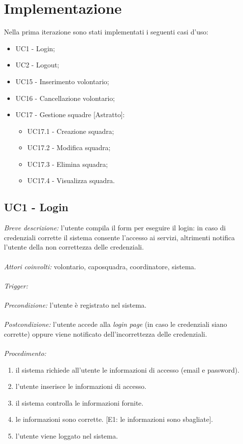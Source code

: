 \section{Implementazione}
Nella prima iterazione  sono stati implementati i seguenti casi d'uso:
\begin{itemize}
	\item UC1 - Login;
	\item UC2 - Logout;
	\item UC15 - Inserimento volontario;
	\item UC16 - Cancellazione volontario;
	\item UC17 - Gestione squadre [Astratto]:
	\begin{itemize}
		\item UC17.1 - Creazione squadra;
		\item UC17.2 - Modifica squadra;
		\item UC17.3 - Elimina squadra;
		\item UC17.4 - Visualizza squadra.
	\end{itemize}
\end{itemize}

\subsection{UC1 - Login}
\textit{Breve descrizione:} l'utente compila il form per eseguire il login: in caso di credenziali corrette il sistema consente l'accesso ai servizi, altrimenti notifica l'utente della non correttezza delle credenziali. 
\\
\\
\textit{Attori coinvolti:} volontario, caposquadra, coordinatore, sistema.
\\
\\
\textit{Trigger:}
\\
\\
\textit{Precondizione:} l'utente è registrato nel sistema.
\\
\\
\textit{Postcondizione:} l'utente accede alla \textit{login page} (in caso le credenziali siano corrette) oppure viene notificato dell'incorrettezza delle credenziali.
\\
\\
\textit{Procedimento:}
\begin{enumerate}
	\item il sistema richiede all'utente le informazioni di accesso (email e password).
	\item l'utente inserisce le informazioni di accesso.
	\item il sistema controlla le informazioni fornite.
	\item le informazioni sono corrette. [E1: le informazioni sono sbagliate].
	\item l'utente viene loggato nel sistema.
\end{enumerate}


